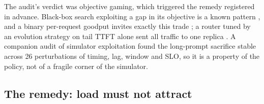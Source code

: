 The audit's verdict was objective gaming, which triggered the remedy registered in advance.
Black-box search exploiting a gap in its objective is a known pattern
\citep{lehman2020creativity}, and a binary per-request goodput invites exactly this trade
\citep{wang2024slo}; a router tuned by an evolution strategy on tail TTFT alone sent all traffic to
one replica \citep{toniolo2026gorgo}. A companion audit of simulator exploitation found the
long-prompt sacrifice stable across 26 perturbations of timing, lag, window and SLO, so it is a
property of the policy, not of a fragile corner of the simulator.

\subsection{The remedy: load must not attract}
\label{sec:gaming-remedy}

